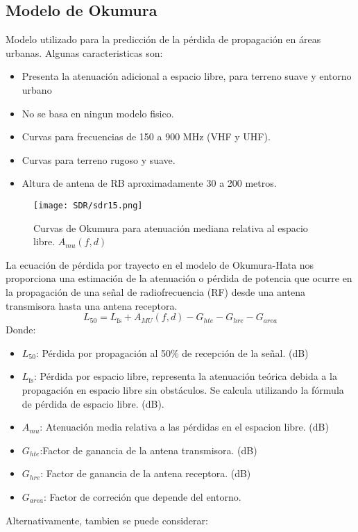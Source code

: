 \documentclass[
	12pt, %
	fleqn, %
	a4paper, %
	oneside, %
]{LegrandOrangeBook}
\begin{document}
\subsection{Modelo de Okumura}
Modelo utilizado para la predicción de la pérdida de propagación en áreas urbanas. Algunas caracteristicas son:
\begin{itemize}
\item Presenta la atenuación adicional a espacio libre, para terreno suave y entorno urbano
\item No se basa en ningun modelo fisico.
\item Curvas para frecuencias de 150 a 900 MHz (VHF y UHF).
\item Curvas para terreno rugoso y suave.
\item Altura de antena de RB aproximadamente 30 a 200 metros.
\end{itemize}
\begin{figure}[H]
\centering
\texttt{[image: SDR/sdr15.png]}
\caption{Curvas de Okumura para atenuación mediana relativa al espacio libre. $A_{mu}(f,d)$}
\end{figure}
La ecuación de pérdida por trayecto en el modelo de Okumura-Hata nos proporciona una estimación de la atenuación o pérdida de potencia que ocurre en la propagación de una señal de radiofrecuencia (RF) desde una antena transmisora hasta una antena receptora.
\begin{equation}
L_{50} = L_{\text{fs}} + A_{MU}(f,d) - G_{hte} - G_{hre} - G_{area}
\label{eq:okumura perdida}
\end{equation}
Donde:
\begin{itemize}
\item $L_{50}$: Pérdida por propagación al 50\% de recepción de la señal. (dB)
\item $L_{\text{fs}}$: Pérdida por espacio libre, representa la atenuación teórica debida a la propagación en espacio libre sin obstáculos. Se calcula utilizando la fórmula de pérdida de espacio libre. (dB).
\item $A_{mu}$: Atenuación media relativa a las pérdidas en el espacion libre. (dB)
\item $G_{hte}$:Factor de ganancia de la antena transmisora. (dB)
\item $G_{hre}$: Factor de ganancia de la antena receptora. (dB)
\item $G_{area}$: Factor de correción que depende del entorno.
\end{itemize}
Alternativamente, tambien se puede considerar:
\end{document}
